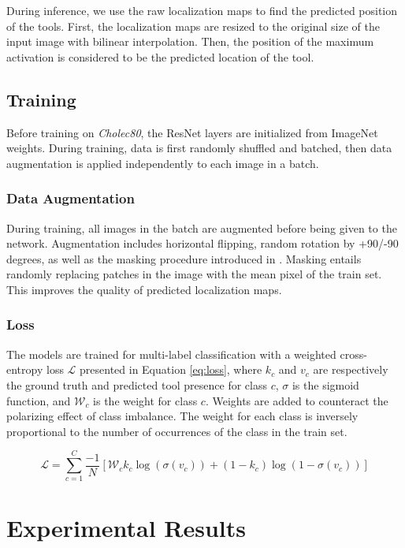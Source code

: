 \documentclass[english,runningheads,a4paper]{llncs}
\begin{document}
During inference, we use the raw localization maps to find the predicted position of the tools. First, the localization maps are resized to the original size of the input image with bilinear interpolation. Then, the position of the maximum activation is considered to be the predicted location of the tool.

\subsection{Training}
Before training on \textit{Cholec80}, the ResNet layers are initialized from ImageNet weights. During training, data is first randomly shuffled and batched, then data augmentation is applied independently to each image in a batch.

\subsubsection{Data Augmentation}
During training, all images in the batch are augmented before being given to the network. Augmentation includes horizontal flipping, random rotation by +90/-90 degrees, as well as the masking procedure introduced in \cite{singh:iccv2017}. Masking entails randomly replacing patches in the image with the mean pixel of the train set. This improves the quality of predicted localization maps.
\subsubsection{Loss}
The models are trained for multi-label classification with a weighted cross-entropy loss $\mathcal{L}$ presented in Equation \ref{eq:loss}, where $k_c$ and $v_c$ are respectively the ground truth and predicted tool presence for class $c$, $\sigma$ is the sigmoid function, and $\mathcal{W}_c$ is the weight for class $c$. Weights are added to counteract the polarizing effect of class imbalance. The weight for each class is inversely proportional to the number of occurrences of the class in the train set.

\begin{equation}\label{eq:loss}
\mathcal{L} = \sum_{c=1}^C\frac{-1}{N}\left [ \mathcal{W}_c k_c \log(\sigma(v_c)) + (1-k_c) \log(1-\sigma(v_c)) \right]
\end{equation}

\section{Experimental Results}
\end{document}
